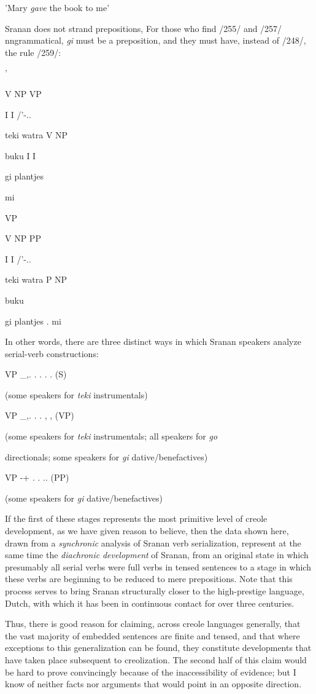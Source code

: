'Mary \textit{gave} the book to me'

Sranan does not strand prepositions, For those who find /255/ and /257/ nngrammatical, \textit{gi }must be a preposition, and they must have, instead of /248/, the rule /259/:

'

\ea\label{ex:261}

\glt
\z

V NP VP

I I /'-..

teki watra V NP

buku I I

gi plantjes

mi

VP

V NP PP

I I /'-..

teki watra P NP 

buku

gi plantjes . mi


In other words, there are three distinct ways in which Sranan speakers analyze serial-verb constructions:

\ea\label{ex:262}
 VP \_,. . . . . (S)
\glt
\z

(some speakers for \textit{teki} instrumentals)

VP \_,. . . , , (VP)

(some speakers for \textit{teki }instrumentals; all speakers for \textit{go}

directionals; some speakers for \textit{gi} dative/benefactives)

VP {}-+ . . .. (PP)

(some speakers for \textit{gi} dative/benefactives)

If the first of these stages represents the most primitive level of creole development, as we have given reason to believe, then the data shown here, drawn from a \textit{synchronic} analysis of Sranan verb serialization, represent at the same time the \textit{diachronic} \textit{development} of Sranan, from an original state in which presumably all serial verbs were full verbs in tensed sentences to a stage in which these verbs are beginning to be reduced to mere prepositions. Note that this process serves to bring Sranan structurally closer to the high-prestige language, Dutch, with which it has been in continuous contact for over three centuries.

Thus, there is good reason for claiming, across creole languages generally, that the vast majority of embedded sentences are finite and tensed, and that where exceptions to this generalization can be found, they constitute developments that have taken place subsequent to creolization. The second half of this claim would be hard to prove con\-vincingly because of the inaccessibility of evidence; but I know of neither facts nor arguments that would point in an opposite direction.

